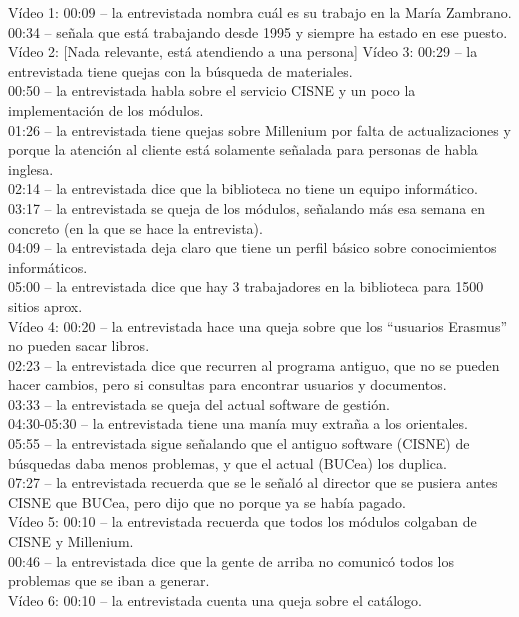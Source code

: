 \documentclass[12pt]{article}
\begin{document}
Vídeo 1: 
00:09 – la entrevistada nombra cuál es su trabajo en la María Zambrano.\\ 
00:34 – señala que está trabajando desde 1995 y siempre ha estado en ese puesto.\\
Vídeo 2:
[Nada relevante, está atendiendo a una persona] 
Vídeo 3:
00:29 – la entrevistada tiene quejas con la búsqueda de materiales.\\ 
00:50 – la entrevistada habla sobre el servicio CISNE y un poco la implementación de los módulos.\\ 
01:26 – la entrevistada tiene quejas sobre Millenium por falta de actualizaciones y porque la atención al cliente está solamente señalada para personas de habla inglesa.\\
02:14 – la entrevistada dice que la biblioteca no tiene un equipo informático.\\
03:17 – la entrevistada se queja de los módulos, señalando más esa semana en concreto (en la que se hace la entrevista).\\
04:09 – la entrevistada deja claro que tiene un perfil básico sobre conocimientos informáticos.\\
05:00 – la entrevistada dice que hay 3 trabajadores en la biblioteca para 1500 sitios aprox.\\
Vídeo 4: 
00:20 – la entrevistada hace una queja sobre que los “usuarios Erasmus” no pueden sacar libros.\\ 
02:23 – la entrevistada dice que recurren al programa antiguo, que no se pueden hacer cambios, pero si consultas para encontrar usuarios y documentos.\\
03:33 – la entrevistada se queja del actual software de gestión.\\
04:30-05:30 – la entrevistada tiene una manía muy extraña a los orientales.\\
05:55 – la entrevistada sigue señalando que el antiguo software (CISNE) de búsquedas daba menos problemas, y que el actual (BUCea) los duplica.\\
07:27 – la entrevistada recuerda que se le señaló al director que se pusiera antes CISNE que BUCea, pero dijo que no porque ya se había pagado.\\
Vídeo 5:
00:10 – la entrevistada recuerda que todos los módulos colgaban de CISNE y Millenium.\\
00:46 – la entrevistada dice que la gente de arriba no comunicó todos los problemas que se iban a generar.\\
Vídeo 6:
00:10 – la entrevistada cuenta una queja sobre el catálogo.\\ 
\end{document}
